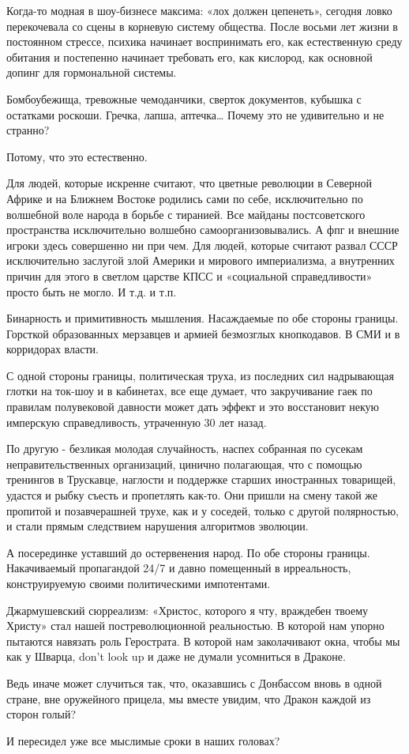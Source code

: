 Когда-то модная в шоу-бизнесе максима: «лох должен цепенеть», сегодня ловко
перекочевала со сцены в корневую систему общества. После восьми лет жизни в
постоянном стрессе, психика начинает воспринимать его, как естественную среду
обитания и постепенно начинает требовать его, как кислород, как основной допинг
для гормональной системы.

Бомбоубежища, тревожные чемоданчики, сверток документов, кубышка с остатками
роскоши. Гречка, лапша, аптечка… Почему это не удивительно и не странно?

Потому, что это естественно. 

Для людей, которые искренне считают, что цветные революции в Северной Африке и
на Ближнем Востоке родились сами по себе, исключительно по волшебной воле
народа в борьбе с тиранией. Все майданы постсоветского пространства
исключительно волшебно самоорганизовывались. А фпг и внешние игроки здесь
совершенно ни при чем. Для людей, которые считают развал СССР исключительно
заслугой злой Америки и мирового империализма, а внутренних причин для этого в
светлом царстве КПСС и «социальной справедливости» просто быть не могло. И т.д.
и т.п.

Бинарность и примитивность мышления. Насаждаемые по обе стороны границы.
Горсткой образованных мерзавцев и армией безмозглых кнопкодавов. В СМИ и в
корридорах власти.

С одной стороны границы, политическая труха, из последних сил надрывающая
глотки на ток-шоу и в кабинетах, все еще думает, что закручивание гаек по
правилам полувековой давности может дать эффект и это восстановит некую
имперскую справедливость, утраченную 30 лет назад.

По другую - безликая молодая случайность, наспех собранная по сусекам
неправительственных организаций, цинично полагающая, что с помощью тренингов в
Трускавце, наглости и поддержке старших иностранных товарищей, удастся и рыбку
съесть и пропетлять как-то. Они пришли на смену такой же пропитой и
позавчерашней трухе, как и у соседей, только с другой полярностью, и стали
прямым следствием нарушения алгоритмов эволюции. 

А посерединке уставший до остервенения народ. По обе стороны границы.
Накачиваемый пропагандой 24/7 и давно помещенный в ирреальность, конструируемую
своими политическими импотентами.

Джармушевский сюрреализм: «Христос, которого я чту, враждебен твоему Христу»
стал нашей постреволюционной реальностью. В которой нам упорно пытаются
навязать роль Герострата. В которой нам заколачивают окна, чтобы мы как у
Шварца, don’t look up и даже не думали усомниться в Драконе.

Ведь иначе может случиться так, что, оказавшись с Донбассом вновь в одной
стране, вне оружейного прицела, мы вместе увидим, что Дракон каждой из сторон
голый? 

И пересидел уже все мыслимые сроки в наших головах?

